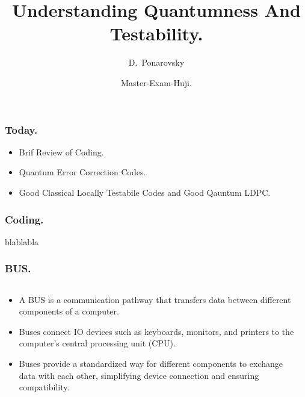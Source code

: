 \documentclass[usenames, aspectratio=169]{beamer}
\title[Understanding Quantumness And Testability.] %
{Understanding Quantumness And Testability.}
\subtitle{  }
\author[D.~Ponarovsky] %
	{D.~Ponarovsky\inst{1}}
\institute[HUJI] %
{  Faculty of Computer Science\newline
  Hebrew University of Jerusalem
}
\date[2023] %
{Master-Exam-Huji.}
\newcommand{\pslsq}[4]{
\begin{frame}
    \frametitle{#1} 
    \texttt{[image: \#3]}
    #4  
  \end{frame}
}
\newcommand{\psls}[4]{
  \begin{frame}
    \frametitle{#1} 
    \begin{columns}[t]
      \begin{column}{.48\textwidth}
        #4
      \end{column}
      \begin{column}{.52\textwidth}
        \adjincludegraphics[width=.98\linewidth, valign=t]{#3}
      \end{column} 
    \end{columns}
  \end{frame}
}
\begin{document}

\begin{frame}
  \maketitle
\end{frame}

\begin{frame}
  \frametitle{ Today. }
  \begin{itemize}
    \item<1-> Brif Review of Coding. 
    \item<2-> Quantum Error Correction Codes.
    \item<3->Good Classical Locally Testabile Codes and Good Qauntum LDPC.
  \end{itemize} 
\end{frame}

\begin{frame}
  \frametitle{ Coding. }
  \begin{center}
\end{center}


\end{frame}



\begin{frame}
blablabla
\end{frame} 

\psls{BUS.}{0.3}{./Peterson-out.png}{ 
  \begin{itemize}[<+->]
    \item  A BUS is a communication pathway that transfers data between different components of a computer.
    \item  Buses connect IO devices such as keyboards, monitors, and printers to the computer's central processing unit (CPU).
    \item  Buses provide a standardized way for different components to exchange data with each other, simplifying device connection and ensuring compatibility.
\end{itemize}
}
\end{document}
